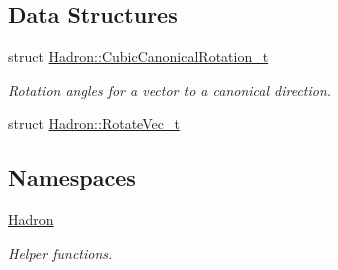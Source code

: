 \subsection*{Data Structures}
\begin{DoxyCompactItemize}
\item 
struct \mbox{\hyperlink{structHadron_1_1CubicCanonicalRotation__t}{Hadron\+::\+Cubic\+Canonical\+Rotation\+\_\+t}}
\begin{DoxyCompactList}\small\item\em Rotation angles for a vector to a canonical direction. \end{DoxyCompactList}\item 
struct \mbox{\hyperlink{structHadron_1_1RotateVec__t}{Hadron\+::\+Rotate\+Vec\+\_\+t}}
\end{DoxyCompactItemize}
\subsection*{Namespaces}
\begin{DoxyCompactItemize}
\item 
 \mbox{\hyperlink{namespaceHadron}{Hadron}}
\begin{DoxyCompactList}\small\item\em Helper functions. \end{DoxyCompactList}\end{DoxyCompactItemize}
